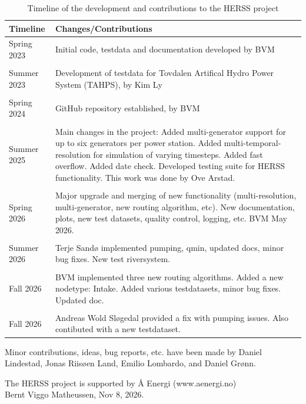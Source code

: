\begin{table}[h]
	\centering
	\begin{tabular}{p{} p{}}
		\hline
		\textbf{Timeline} & \textbf{Changes/Contributions} \\
		\hline
		
		Spring 2023 &
		Initial code, testdata and documentation developed by BVM \\
		\\
		
		Summer 2023 &
		Development of testdata for Tovdalen Artifical Hydro Power System (TAHPS), by Kim Ly  \\
		\\
		
		
		Spring 2024 & GitHub repository established, by BVM \\
		\\
		
		Summer 2025 & 
		Main changes in the project: Added multi-generator support for up
		to six generators per power station. Added multi-temporal-
		resolution for simulation of varying timesteps. Added fast
		overflow. Added date check. Developed testing suite for HERSS
		functionality. This work was done by Ove Arstad. \\
		\\
		
		Spring 2026 & 
		Major upgrade and merging of new functionality (multi-resolution, multi-generator, new routing algorithm, etc). New documentation, plots, new test datasets, quality control, logging, etc. BVM May 2026. \\
		\\
		
		
		Summer 2026 &
		Terje Sandø implemented pumping, qmin, updated docs, minor bug fixes. New test riversystem. \\
		\\
				
		Fall 2026 &
		BVM implemented three new routing algorithms. Added a new nodetype: Intake. Added various testdatasets, minor bug fixes. Updated doc. \\
		\\
						
		Fall 2026 &
		Andreas Wold Sløgedal provided a fix with pumping issues. Also contibuted with a new testdataset.\\
		
		\hline
		
		
	\end{tabular}
	\caption{Timeline of the development and contributions to the HERSS project}
	\label{tab:history}
\end{table}

Minor contributions, ideas, bug reports, etc. have been made by Daniel Lindestad, Jonas Riisøen Land, Emilio Lombardo, and Daniel Grønn.


The HERSS project is supported by Å Energi (www.aenergi.no) \\

Bernt Viggo Matheussen, Nov 8, 2026.



